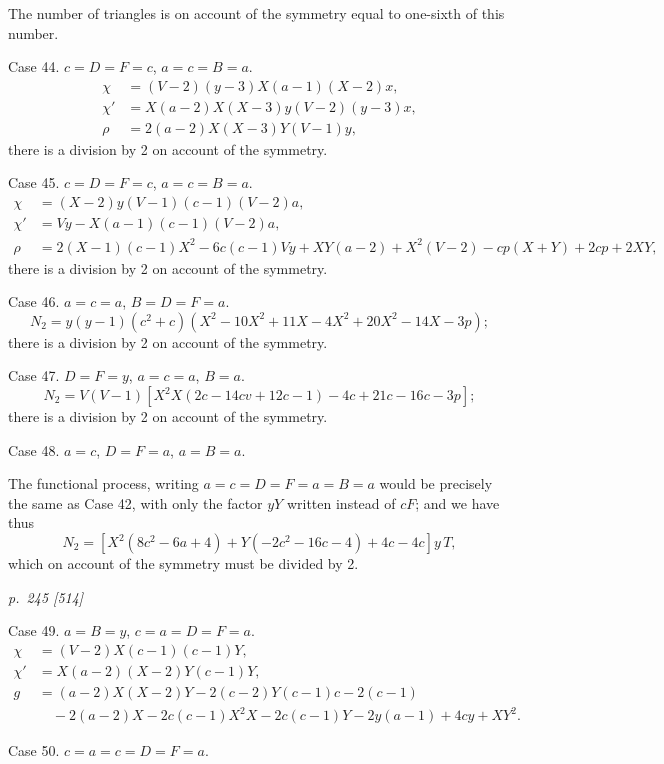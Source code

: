 \documentclass[11pt,a4paper]{article}
\theoremstyle{plain}
\theoremstyle{definition}
\begin{document}
The number of triangles is on account of the symmetry equal to one-sixth of this
number.

Case 44.  $c = D = F = c$, $a = c = B = a$.
\begin{align*}
\chi &= (V - 2)(y - 3)X(a - 1)(X - 2)x, \\
\chi' &= X(a - 2)X(X - 3)y(V - 2)(y - 3)x, \\
\rho &= 2(a - 2)X(X - 3)Y(V - 1)y,
\end{align*}
there is a division by 2 on account of the symmetry.

Case 45.  $c = D = F = c$, $a = c = B = a$.
\begin{align*}
\chi &= (X - 2)y(V - 1)(c - 1)(V - 2)a, \\
\chi' &= V\!y - X(a - 1)(c - 1)(V - 2)a, \\
\rho &= 2(X - 1)(c - 1)X^2 - 6c(c - 1)Vy + XY(a - 2) + X^2(V - 2) - cp(X + Y) + 2cp + 2XY,
\end{align*}
there is a division by 2 on account of the symmetry.

Case 46.  $a = c = a$, $B = D = F = a$.
\[
N_2 = y(y - 1)(c^2 + c)(X^2 - 10X^2 + 11X - 4X^2 + 20X^2 - 14X - 3p);
\]
there is a division by 2 on account of the symmetry.

Case 47.  $D = F = y$, $a = c = a$, $B = a$.
\[
N_2 = V(V - 1)[X^2 X (2c - 14cv + 12c - 1) - 4c + 21c - 16c - 3p];
\]
there is a division by 2 on account of the symmetry.

Case 48.  $a = c$, $D = F = a$, $a = B = a$.

The functional process, writing $a = c = D = F = a = B = a$ would be precisely the same
as Case 42, with only the factor $yY$ written instead of $cF$; and we have thus
\[
N_2 = [X^2(8c^2 - 6a + 4) + Y(-2c^2 - 16c - 4) + 4c - 4c]
y \, T,
\]
which on account of the symmetry must be divided by 2.

\clearpage

\bigskip
\textit{p.~245 [514]}
\smallskip

Case 49.  $a = B = y$, $c = a = D = F = a$.
\begin{align*}
\chi &= (V - 2)X(c - 1)(c - 1)Y, \\
\chi' &= X(a - 2)(X - 2)Y(c - 1)Y, \\
g &= (a - 2)X(X - 2)Y - 2(c - 2)Y(c - 1)c - 2(c - 1) \\
&\quad - 2(a - 2)X - 2c(c - 1)X^2 X - 2c(c - 1)Y - 2y(a - 1) + 4cy + XY^2.
\end{align*}

Case 50.  $c = a = c = D = F = a$.
\end{document}
